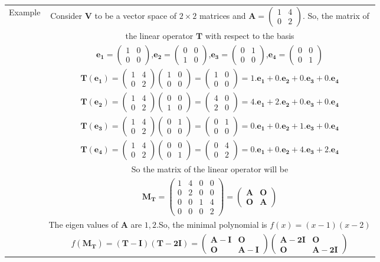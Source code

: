 \documentclass[journal,12pt,twocolumn]{IEEEtran}
\providecommand{\brak}[1]{\ensuremath{\left(#1\right)}}
\newcommand{\myvec}[1]{\ensuremath{\begin{pmatrix}#1\end{pmatrix}}}
\numberwithin{equation}{subsection}
\let\vec\mathbf
\newcommand\myemptypage{
	\null
	\thispagestyle{empty}
	\addtocounter{page}{-1}
	\newpage
}
\begin{document}
\pagebreak
\myemptypage
\begin{table}[h]
    \centering
    \begin{tabular}{|c|c|}
    \hline
         Example& Consider $\vec{V}$ to be a vector space of $2\times 2$ matrices and $\vec{A}=\myvec{1&4\\0&2}$. So, the matrix of\\
         & the linear operator $\vec{T}$ with respect to the basis \\
         & $\vec{e_1}=\myvec{1&0\\0&0}$,\quad$\vec{e_2}=\myvec{0&0\\1&0}$,\quad$\vec{e_3}=\myvec{0&1\\0&0}$,\quad$\vec{e_4}=\myvec{0&0\\0&1}$\\
         & $\vec{T\brak{e_1}}=\myvec{1&4\\0&2}\myvec{1&0\\0&0}=\myvec{1&0\\0&0}=1.\vec{e_1}+0.\vec{e_2}+0.\vec{e_3}+0.\vec{e_4}$\\
         &$\vec{T\brak{e_2}}=\myvec{1&4\\0&2}\myvec{0&0\\1&0}=\myvec{4&0\\2&0}=4.\vec{e_1}+2.\vec{e_2}+0.\vec{e_3}+0.\vec{e_4}$\\
         &$\vec{T\brak{e_3}}=\myvec{1&4\\0&2}\myvec{0&1\\0&0}=\myvec{0&1\\0&0}=0.\vec{e_1}+0.\vec{e_2}+1.\vec{e_3}+0.\vec{e_4}$\\
         &$\vec{T\brak{e_4}}=\myvec{1&4\\0&2}\myvec{0&0\\0&1}=\myvec{0&4\\0&2}=0.\vec{e_1}+0.\vec{e_2}+4.\vec{e_3}+2.\vec{e_4}$\\ 
         &So the matrix of the linear operator will be\\
         &$\vec{M_T}=\myvec{1&4&0&0\\0&2&0&0\\0&0&1&4\\0&0&0&2}=\myvec{\vec{A}&\vec{O}\\\vec{O}&\vec{A}}$\\
         &The eigen values of $\vec{A}$ are $1,2$.So, the minimal polynomial is $f\brak{x}=\brak{x-1}\brak{x-2}$\\
         &$f\brak{\vec{M_T}}=\brak{\vec{T-I}}\brak{\vec{T-2I}}=\myvec{\vec{A-I}&\vec{O}\\\vec{O}&\vec{A-I}}\myvec{\vec{A-2I}&\vec{O}\\\vec{O}&\vec{A-2I}}$\\

\end{tabular}
\end{table}
\end{document}
